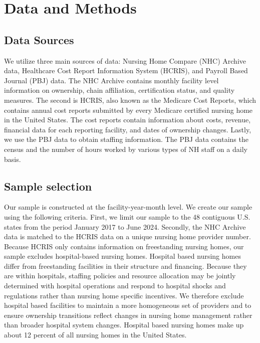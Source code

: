 \documentclass[12pt]{article}
\begin{document}
\section{Data and Methods}
\subsection{Data Sources}
We utilize three main sources of data: Nursing Home Compare (NHC) Archive data, Healthcare Cost Report Information System (HCRIS), and Payroll Based Journal (PBJ) data. The NHC Archive contains monthly facility level information on ownership, chain affiliation, certification status, and quality measures. The second is HCRIS, also known as the Medicare Cost Reports, which contains annual cost reports submitted by every Medicare certified nursing home in the United States. The cost reports contain information about costs, revenue, financial data for each reporting facility, and dates of ownership changes. Lastly, we use the PBJ data to obtain staffing information. The PBJ data contains the census and the number of hours worked by various types of NH staff on a daily basis.

\subsection{Sample selection}

Our sample is constructed at the facility-year-month level. We create our sample using the following criteria. First, we limit our sample to the 48 contiguous U.S. states from the period January 2017 to June 2024. Secondly, the NHC Archive data is matched to the HCRIS data on a unique nursing home provider number. Because HCRIS only contains information on freestanding nursing homes, our sample excludes hospital-based nursing homes. Hospital based nursing homes differ from freestanding facilities in their structure and financing. Because they are within hospitals, staffing policies and resource allocation may be jointly determined with hospital operations and respond to hospital shocks and regulations rather than nursing home specific incentives. We therefore exclude hospital based facilities to maintain a more homogeneous set of providers and to ensure ownership transitions reflect changes in nursing home management rather than broader hospital system changes.  Hospital based nursing homes make up about 12 percent of all nursing homes in the United States. 

\end{document}
